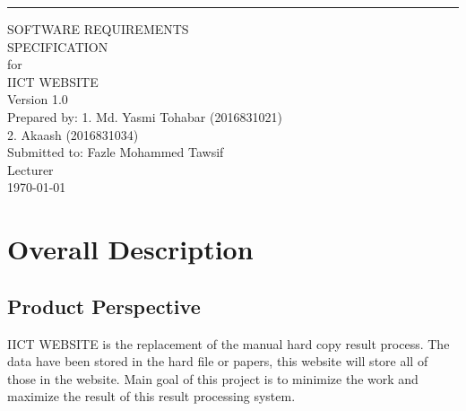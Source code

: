 \documentclass{scrreprt}
\date{}
\def\myversion{1.0 }
\begin{document}
\begin{flushright}
    \rule{\linewidth}{5pt}\vskip1cm
    \begin{bfseries}
        \Huge{SOFTWARE REQUIREMENTS\\ SPECIFICATION}\\
        \vspace{1.5cm}
        for\\
        \vspace{1.5cm}
        IICT WEBSITE\\
        \vspace{1.5cm}
        \LARGE{Version \myversion}\\
        \vspace{1.5cm}
        Prepared by: 1. Md. Yasmi Tohabar (2016831021)\\
        2. Akaash (2016831034)\\
        \vspace{1.5cm}
        Submitted to: Fazle Mohammed Tawsif \\Lecturer\\
        \vspace{1.5cm}
        \today\\
    \end{bfseries}
\end{flushright}

\tableofcontents



\chapter{Overall Description}

\section{Product Perspective}
IICT WEBSITE is the replacement of the manual hard copy result process. The data have been stored in the hard file or papers, this website will store all of those in the website. Main goal of this project is to minimize the work and maximize the result of this result processing system.
\end{document}
